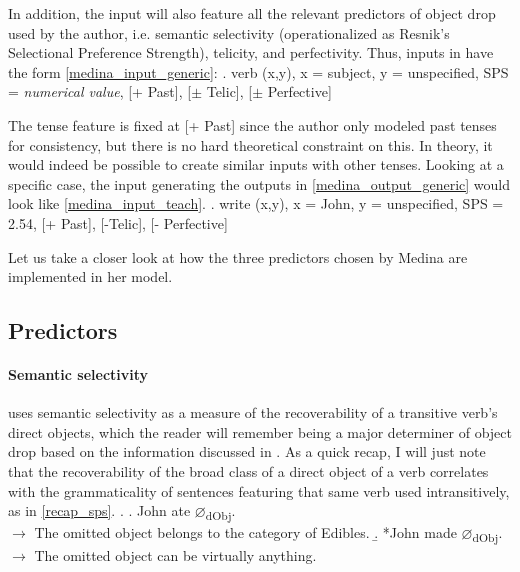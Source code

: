 In addition, the input will also feature all the relevant predictors of object drop used by the author, i.e. semantic selectivity (operationalized as Resnik's Selectional Preference Strength), telicity, and perfectivity. Thus, inputs in \textcite{Medina2007} have the form \ref{medina_input_generic}:
\ex. \label{medina_input_generic} verb (x,y), x = subject, y = unspecified, SPS = \textit{numerical value}, [+ Past], [$\pm$ Telic], [$\pm$ Perfective]

The tense feature is fixed at [+ Past] since the author only modeled past tenses for consistency, but there is no hard theoretical constraint on this. In theory, it would indeed be possible to create similar inputs with other tenses. Looking at a specific case, the input generating the outputs in \ref{medina_output_generic} would look like \ref{medina_input_teach}.
\ex. \label{medina_input_teach} write (x,y), x = John, y = unspecified, SPS = 2.54, [+ Past], [-Telic], [- Perfective]

Let us take a closer look at how the three predictors chosen by Medina are implemented in her model.


\subsection{Predictors} 

\paragraph{Semantic selectivity} \textcite{Medina2007} uses semantic selectivity as a measure of the recoverability of a transitive verb's direct objects, which the reader will remember being a major determiner of object drop based on the information discussed in . As a quick recap, I will just note that the recoverability of the broad class of a direct object of a verb correlates with the grammaticality of sentences featuring that same verb used intransitively, as in \ref{recap_sps}.
\ex. \label{recap_sps} \a. John ate $\varnothing$\textsubscript{dObj}. \\ $\longrightarrow$ The omitted object belongs to the category of Edibles.
\b. *John made $\varnothing$\textsubscript{dObj}. \\ $\longrightarrow$ The omitted object can be virtually anything.

